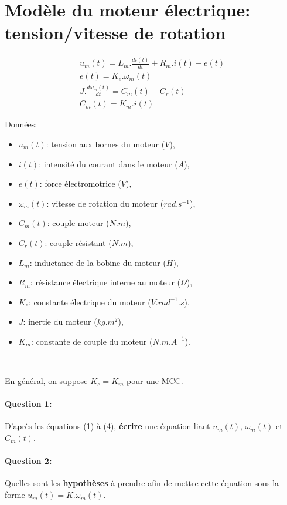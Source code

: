 



\\

\section{Modèle du moteur électrique: tension/vitesse de rotation}

\begin{eqnarray}
u_m(t)=L_m.\frac{di(t)}{dt}+R_m.i(t)+e(t) \\
e(t)=K_e.\omega_m(t) \\
J.\frac{d\omega_m(t)}{dt}=C_m(t)-C_r(t) \\
C_m(t)=K_m.i(t)
\end{eqnarray}

Données:
\begin{itemize}
 \item $u_m(t)$: tension aux bornes du moteur ($V$),
 \item $i(t)$: intensité du courant dans le moteur ($A$),
 \item $e(t)$: force électromotrice ($V$),
 \item $\omega_m(t)$: vitesse de rotation du moteur ($rad.s^{-1}$),
 \item $C_m(t)$: couple moteur ($N.m$),
 \item $C_r(t)$: couple résistant ($N.m$),
 \item $L_m$: inductance de la bobine du moteur ($H$),
 \item $R_m$: résistance électrique interne au moteur ($\Omega$),
 \item $K_e$: constante électrique du moteur ($V.rad^{-1}.s$),
 \item $J$: inertie du moteur ($kg.m^2$),
 \item $K_m$: constante de couple du moteur ($N.m.A^{-1}$).
\end{itemize}

~\

En général, on suppose $K_e=K_m$ pour une MCC.

\paragraph{Question 1:} D'après les équations (1) à (4), \textbf{écrire} une équation liant $u_m(t)$, $\omega_m(t)$ et $C_m(t)$.

\paragraph{Question 2:} Quelles sont les \textbf{hypothèses} à prendre afin de mettre cette équation sous la forme $u_m(t)=K.\omega_m(t)$.

